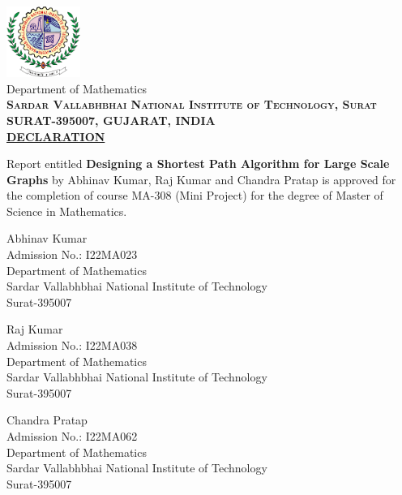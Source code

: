 \newpage



\begin{center}
	\includegraphics[width=0.18\textwidth]{./svnit-logo}\\[0.1in]
	\huge{Department of Mathematics}\\[0.1cm]
	\normalsize
	\textbf{\textsc{Sardar Vallabhbhai National Institute of Technology, Surat \\ SURAT-395007, GUJARAT, INDIA}}\\[1.5cm]
	
	\textbf{\LARGE \underline{DECLARATION}}\\[0.5cm]
\end{center}

\begin{justify}
	\normalsize Report entitled \textbf{Designing a Shortest Path Algorithm for Large Scale Graphs} 
	by Abhinav Kumar, Raj Kumar and Chandra Pratap is approved for the completion 
	of course MA-308 (Mini Project) for the degree of Master of Science in Mathematics.
\end{justify}

\vspace{1cm}

\RaggedRight
Abhinav Kumar\\
Admission No.: I22MA023\\
Department of Mathematics\\
Sardar Vallabhbhai National Institute of Technology\\
Surat-395007

\vspace{0.5cm}

Raj Kumar\\
Admission No.: I22MA038\\
Department of Mathematics\\
Sardar Vallabhbhai National Institute of Technology\\
Surat-395007

\vspace{0.5cm}

Chandra Pratap\\
Admission No.: I22MA062\\
Department of Mathematics\\
Sardar Vallabhbhai National Institute of Technology\\
Surat-395007